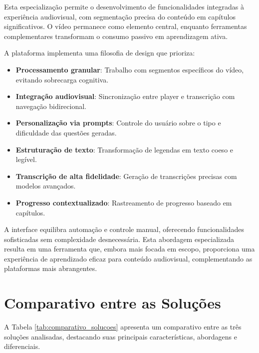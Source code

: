 \documentclass[tcc,capa]{texufpel}
\begin{document}
Esta especialização permite o desenvolvimento de funcionalidades integradas à experiência audiovisual, com segmentação precisa do conteúdo em capítulos significativos. O vídeo permanece como elemento central, enquanto ferramentas complementares transformam o consumo passivo em aprendizagem ativa.

A plataforma implementa uma filosofia de design que prioriza:

\begin{itemize}
    \item \textbf{Processamento granular}: Trabalho com segmentos específicos do vídeo, evitando sobrecarga cognitiva.
    
    \item \textbf{Integração audiovisual}: Sincronização entre player e transcrição com navegação bidirecional.
    
    \item \textbf{Personalização via prompts}: Controle do usuário sobre o tipo e dificuldade das questões geradas.
    
    \item \textbf{Estruturação de texto}: Transformação de legendas em texto coeso e legível.
    
    \item \textbf{Transcrição de alta fidelidade}: Geração de transcrições precisas com modelos avançados.
    
    \item \textbf{Progresso contextualizado}: Rastreamento de progresso baseado em capítulos.
\end{itemize}

A interface equilibra automação e controle manual, oferecendo funcionalidades sofisticadas sem complexidade desnecessária. Esta abordagem especializada resulta em uma ferramenta que, embora mais focada em escopo, proporciona uma experiência de aprendizado eficaz para conteúdo audiovisual, complementando as plataformas mais abrangentes.

\section{Comparativo entre as Soluções}

A Tabela \ref{tab:comparativo_solucoes} apresenta um comparativo entre as três soluções analisadas, destacando suas principais características, abordagens e diferenciais.
\end{document}
